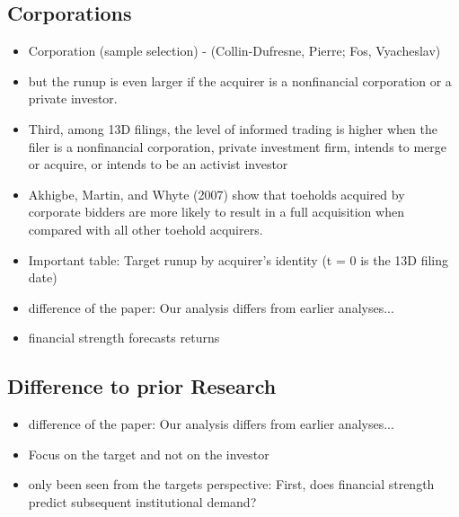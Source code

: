\documentclass[12pt]{article}
\begin{document}
\subsection{Corporations}

    \begin{itemize}

        \item Corporation (sample selection) - (Collin-Dufresne, Pierre; Fos, Vyacheslav)

        \item but the runup is even larger if the acquirer is a nonfinancial corporation or a private investor.\citep{Brigida2012}

        \item Third, among 13D filings, the level of informed trading is higher when the filer is a nonfinancial corporation, private investment firm, intends to merge or acquire, or intends to be an activist investor \citep{Brigida2012}

        \item Akhigbe, Martin, and Whyte (2007) show that toeholds acquired by corporate bidders are more likely to result in a full acquisition when compared with all other toehold acquirers.\citep{Brigida2012}

        \item Important table: Target runup by acquirer's identity (t = 0 is the 13D filing date) \citep{Brigida2012}

        \item difference of the paper: Our analysis differs from earlier analyses...\citep{Brigida2012}

        \item financial strength forecasts returns \citep{Choi2012}

    \end{itemize}

\subsection{Difference to prior Research}

    \begin{itemize}

        \item difference of the paper: Our analysis differs from earlier analyses...\citep{Brigida2012}

        \item Focus on the target and not on the investor 

        \item only been seen from the targets perspective: First, does financial strength predict subsequent institutional demand? \citep{Choi2012}

    \end{itemize}
\end{document}
